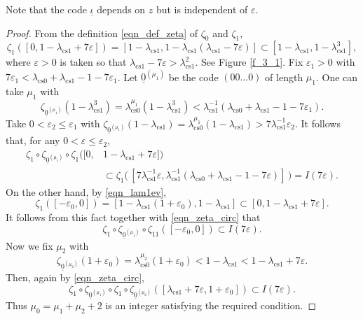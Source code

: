 \documentclass{amsart}
\theoremstyle{definition}
\numberwithin{equation}{section}
\numberwithin{figure}{section}
\begin{document}
Note that the code $\underline\iota$ depends on $z$ but is independent of $\varepsilon$.


\begin{proof}
From the definition \eqref{eqn_def_zeta} of $\zeta_0$ and $\zeta_1$, 
$$\zeta_1([0,1-\lambda_{\mathrm{cs} 1}+7\varepsilon])=[1-\lambda_{\mathrm{cs} 1}, 1-\lambda_{\mathrm{cs} 1}(\lambda_{\mathrm{cs} 1}-7\varepsilon)]
\subset [1-\lambda_{\mathrm{cs} 1},1-\lambda_{\mathrm{cs} 1}^3],$$
where $\varepsilon>0$ is taken so that $\lambda_{\mathrm{cs} 1}-7\varepsilon>\lambda_{\mathrm{cs} 1}^2$.
See Figure \ref{f_3_1}.
Fix $\varepsilon_1>0$ with $7\varepsilon_1<\lambda_{\mathrm{cs} 0}+\lambda_{\mathrm{cs} 1}-1-7\varepsilon_1$.
Let $\underline 0^{(\mu_1)}$ be the code $(00\dots 0)$ of length $\mu_1$.
One can take $\mu_1$ with 
$$\zeta_{\underline{0}^{(\mu_1)}}(1-\lambda_{\mathrm{cs} 1}^3)=\lambda_{\mathrm{cs} 0}^{\mu_1}(1-\lambda_{\mathrm{cs} 1}^3)<
\lambda_{\mathrm{cs} 1}^{-1}(\lambda_{\mathrm{cs} 0}+\lambda_{\mathrm{cs} 1}-1-7\varepsilon_1).$$
Take $0<\varepsilon_2\leq \varepsilon_1$ with 
$\zeta_{\underline{0}^{(\mu_1)}}(1-\lambda_{\mathrm{cs} 1})=\lambda_{\mathrm{cs} 0}^{\mu_1}(1-\lambda_{\mathrm{cs} 1})>7\lambda_{\mathrm{cs} 1}^{-1}\varepsilon_2$.
It follows that, for any $0<\varepsilon\leq \varepsilon_2$,
\begin{equation}\label{eqn_zeta_circ}
\begin{split}
\zeta_1\circ \zeta_{\underline{0}^{(\mu_1)}}\circ \zeta_1([0,& 1-\lambda_{\mathrm{cs} 1}+7\varepsilon])\\
&\subset \zeta_1\bigl(\,[7\lambda_{\mathrm{cs} 1}^{-1}\varepsilon,\lambda_{\mathrm{cs} 1}^{-1}(\lambda_{\mathrm{cs} 0}+\lambda_{\mathrm{cs} 1}-1-7\varepsilon)]\,\bigr)=I(7\varepsilon).
\end{split}
\end{equation}
On the other hand, by \eqref{eqn_lam1ev}, 
$$\zeta_1([-\varepsilon_0,0])=[1-\lambda_{\mathrm{cs} 1}(1+\varepsilon_0),1-\lambda_{\mathrm{cs} 1}]\subset [0,1-\lambda_{\mathrm{cs} 1}+7\varepsilon].$$
It follows from this fact together with \eqref{eqn_zeta_circ} that 
$$
\zeta_1\circ \zeta_{\underline{0}^{(\mu_1)}}\circ \zeta_{11}([-\varepsilon_0,0])
\subset I(7\varepsilon).$$
Now we fix $\mu_2$ with 
$$\zeta_{\underline{0}^{(\mu_2)}}(1+\varepsilon_0)=\lambda_{\mathrm{cs} 0}^{\mu_2}(1+\varepsilon_0)
<1-\lambda_{\mathrm{cs} 1}<1-\lambda_{\mathrm{cs} 1}+7\varepsilon.$$
Then, again by \eqref{eqn_zeta_circ},
$$\zeta_1\circ \zeta_{\underline{0}^{(\mu_1)}}\circ \zeta_1\circ \zeta_{\underline{0}^{(\mu_2)}}
([\lambda_{\mathrm{cs} 1}+7\varepsilon,1+\varepsilon_0])\subset I(7\varepsilon).$$
Thus $\mu_0=\mu_1+\mu_2+2$ is an integer satisfying the required condition.
\end{proof}
\end{document}

